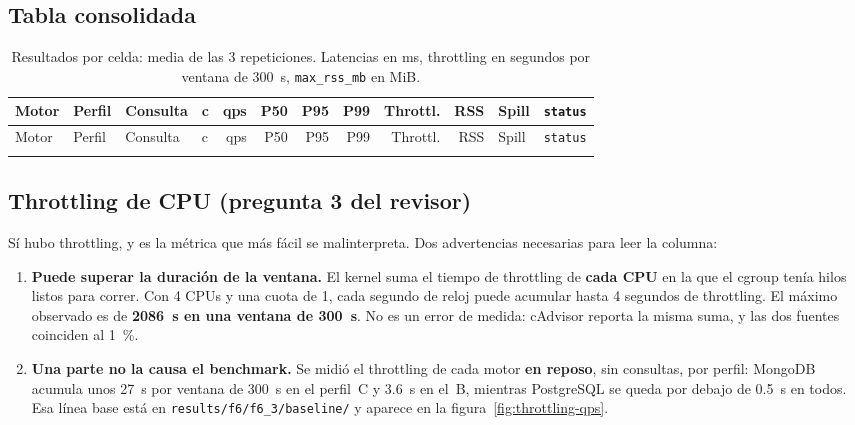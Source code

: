 \subsection{Tabla consolidada}

{\setlength{\tabcolsep}{3pt}
\begin{longtable}{llllrrrrrrll}
  \caption{Resultados por celda: media de las 3 repeticiones. Latencias en ms,
           throttling en segundos por ventana de 300~s, \texttt{max\_rss\_mb} en
           MiB.\label{tab:resultados}}\\
  \toprule
  Motor & Perfil & Consulta & c & qps & P50 & P95 & P99 & Throttl. & RSS & Spill & \texttt{status} \\
  \midrule
  \endfirsthead
  \toprule
  Motor & Perfil & Consulta & c & qps & P50 & P95 & P99 & Throttl. & RSS & Spill & \texttt{status} \\
  \midrule
  \endhead
  \bottomrule
  \endfoot
  
\end{longtable}}

\leyendaNotas{}

\subsection{Throttling de CPU (pregunta 3 del revisor)}

Sí hubo throttling, y es la métrica que más fácil se malinterpreta. Dos
advertencias necesarias para leer la columna:

\begin{enumerate}
  \item \textbf{Puede superar la duración de la ventana.} El kernel suma el tiempo
        de throttling de \textbf{cada CPU} en la que el cgroup tenía hilos listos
        para correr. Con 4 CPUs y una cuota de 1, cada segundo de reloj puede
        acumular hasta 4 segundos de throttling. El máximo observado es de
        \textbf{2086~s en una ventana de 300~s}. No es un error de medida: cAdvisor
        reporta la misma suma, y las dos fuentes coinciden al 1~\%.
  \item \textbf{Una parte no la causa el benchmark.} Se midió el throttling de cada
        motor \textbf{en reposo}, sin consultas, por perfil: MongoDB acumula unos
        27~s por ventana de 300~s en el perfil~C y 3.6~s en el~B, mientras
        PostgreSQL se queda por debajo de 0.5~s en todos. Esa línea base está en
        \texttt{results/f6/f6\_3/baseline/} y aparece en la
        figura~\ref{fig:throttling-qps}.
\end{enumerate}

